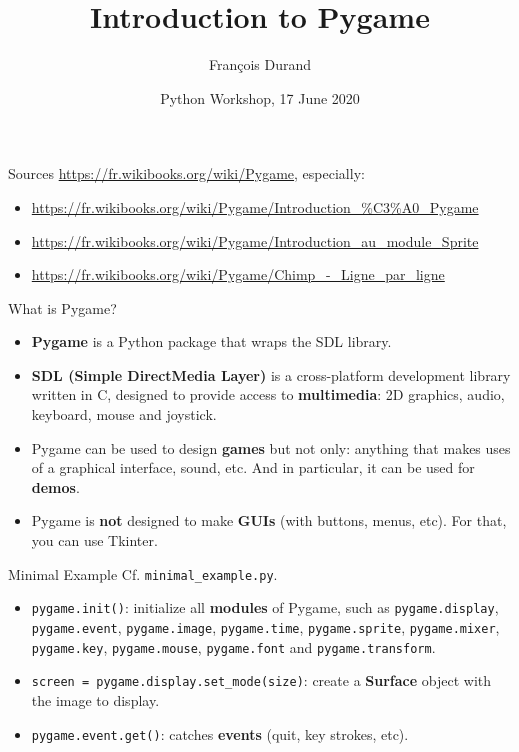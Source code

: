 \documentclass[aspectratio=169]{beamer}
\title{Introduction to Pygame}
\author{\normalsize François Durand\\[5pt]}
\date{\vspace{-.5cm}Python Workshop, 17 June 2020}
\renewcommand{\emph}[1]{\textcolor{ClearTitle}{\bf #1}}
\begin{document}
\begin{frame}
\titlepage
\end{frame}

\begin{frame}{Sources}
\url{https://fr.wikibooks.org/wiki/Pygame}, especially:
\begin{itemize}
\item \url{https://fr.wikibooks.org/wiki/Pygame/Introduction_\%C3\%A0_Pygame}
\item \url{https://fr.wikibooks.org/wiki/Pygame/Introduction_au_module_Sprite}
\item \url{https://fr.wikibooks.org/wiki/Pygame/Chimp_-_Ligne_par_ligne}
\end{itemize}
\end{frame}

\begin{frame}{What is Pygame?}
\begin{itemize}
\item \emph{Pygame} is a Python package that wraps the SDL library.
\item \emph{SDL (Simple DirectMedia Layer)} is a cross-platform development library written in C, designed to provide access to \emph{multimedia}: 2D graphics, audio, keyboard, mouse and joystick.
\item Pygame can be used to design \emph{games} but not only: anything that makes uses of a graphical interface, sound, etc. And in particular, it can be used for \emph{demos}.
\item Pygame is \emph{not} designed to make \emph{GUIs} (with buttons, menus, etc). For that, you can use Tkinter.
\end{itemize}
\end{frame}

\begin{frame}[fragile]{Minimal Example}
Cf.  \verb|minimal_example.py|.
\begin{itemize}
\item \verb|pygame.init()|: initialize all \emph{modules} of Pygame, such as \verb|pygame.display|, \verb|pygame.event|, \verb|pygame.image|, \verb|pygame.time|, \verb|pygame.sprite|, \verb|pygame.mixer|,  \verb|pygame.key|, \verb|pygame.mouse|, \verb|pygame.font| and \verb|pygame.transform|.
\item \verb|screen = pygame.display.set_mode(size)|: create a \emph{Surface} object with the image to display.
\item \verb|pygame.event.get()|: catches \emph{events} (quit, key strokes, etc).
\end{itemize}
\end{frame}
\end{document}

